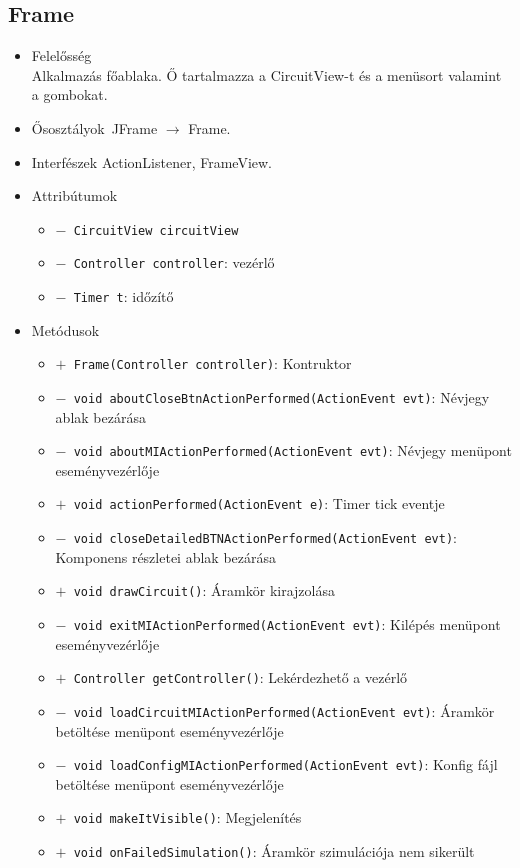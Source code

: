 \subsection{Frame}
\begin{itemize}
\item Felelősség\\
Alkalmazás főablaka. Ő tartalmazza a CircuitView-t és a menüsort valamint a gombokat.
\item Ősosztályok\ JFrame $\rightarrow{}$ Frame.
\item Interfészek ActionListener, FrameView.
\item Attribútumok $\ $
\begin{itemize}
	\item[] \texttt{$-$ CircuitView circuitView} 
	\item[] \texttt{$-$ Controller controller}: vezérlő
	\item[] \texttt{$-$ Timer t}: időzítő
\end{itemize}
\item Metódusok$\ $
\begin{itemize}
	\item[] \texttt{$+$ Frame(Controller controller)}: Kontruktor
	\item[] \texttt{$-$ void aboutCloseBtnActionPerformed(ActionEvent evt)}: Névjegy ablak bezárása
	\item[] \texttt{$-$ void aboutMIActionPerformed(ActionEvent evt)}: Névjegy menüpont eseményvezérlője
	\item[] \texttt{$+$ void actionPerformed(ActionEvent e)}: Timer tick eventje
	\item[] \texttt{$-$ void closeDetailedBTNActionPerformed(ActionEvent evt)}: Komponens részletei ablak bezárása
	\item[] \texttt{$+$ void drawCircuit()}: Áramkör kirajzolása
	\item[] \texttt{$-$ void exitMIActionPerformed(ActionEvent evt)}: Kilépés menüpont eseményvezérlője
	\item[] \texttt{$+$ Controller getController()}: Lekérdezhető a vezérlő
	\item[] \texttt{$-$ void loadCircuitMIActionPerformed(ActionEvent evt)}: Áramkör betöltése menüpont eseményvezérlője
	\item[] \texttt{$-$ void loadConfigMIActionPerformed(ActionEvent evt)}: Konfig fájl betöltése menüpont eseményvezérlője
	\item[] \texttt{$+$ void makeItVisible()}: Megjelenítés
	\item[] \texttt{$+$ void onFailedSimulation()}: Áramkör szimulációja nem sikerült

\end{itemize}
\end{itemize}
